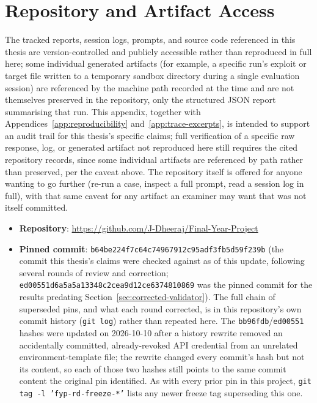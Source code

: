 \documentclass[12pt,a4paper]{report}
\begin{document}
\chapter{Repository and Artifact Access}
\label{app:repo-access}

The tracked reports, session logs, prompts, and source code referenced in this thesis are version-controlled and publicly accessible rather than reproduced in full here; some individual generated artifacts (for example, a specific run's exploit or target file written to a temporary sandbox directory during a single evaluation session) are referenced by the machine path recorded at the time and are not themselves preserved in the repository, only the structured JSON report summarising that run. This appendix, together with Appendices~\ref{app:reproducibility} and~\ref{app:trace-excerpts}, is intended to support an audit trail for this thesis's specific claims; full verification of a specific raw response, log, or generated artifact not reproduced here still requires the cited repository records, since some individual artifacts are referenced by path rather than preserved, per the caveat above. The repository itself is offered for anyone wanting to go further (re-run a case, inspect a full prompt, read a session log in full), with that same caveat for any artifact an examiner may want that was not itself committed.

\begin{itemize}
\item \textbf{Repository}: \url{https://github.com/J-Dheeraj/Final-Year-Project}
\item \textbf{Pinned commit}: \texttt{b64be224f7c64c74967912c95adf3fb5d59f239b} (the commit this thesis's claims were checked against as of this update, following several rounds of review and correction; \texttt{ed00551d6a5a5a13348c2cea9d12ce6374810869} was the pinned commit for the results predating Section~\ref{sec:corrected-validator}). The full chain of superseded pins, and what each round corrected, is in this repository's own commit history (\texttt{git log}) rather than repeated here. The \texttt{bb96fdb}/\texttt{ed00551} hashes were updated on 2026-10-10 after a history rewrite removed an accidentally committed, already-revoked API credential from an unrelated environment-template file; the rewrite changed every commit's hash but not its content, so each of those two hashes still points to the same commit content the original pin identified. As with every prior pin in this project, \texttt{git tag -l 'fyp-rd-freeze-*'} lists any newer freeze tag superseding this one.
\end{itemize}
\end{document}

